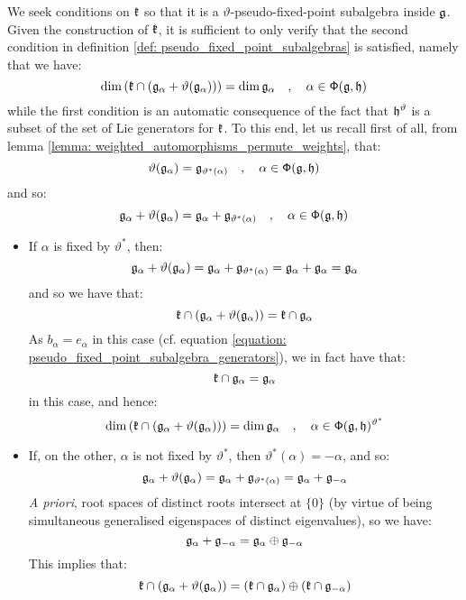         We seek conditions on $\mathfrak{k}$ so that it is a $\vartheta$-pseudo-fixed-point subalgebra inside $\mathfrak{g}$. Given the construction of $\mathfrak{k}$, it is sufficient to only verify that the second condition in definition \ref{def: pseudo_fixed_point_subalgebras} is satisfied, namely that we have:
            $$\dim\left( \mathfrak{k} \cap \left( \mathfrak{g}_{\alpha} + \vartheta(\mathfrak{g}_{\alpha}) \right) \right) = \dim \mathfrak{g}_{\alpha} \quad, \quad \alpha \in \mathsf{\Phi}(\mathfrak{g}, \mathfrak{h})$$
        while the first condition is an automatic consequence of the fact that $\mathfrak{h}^{\vartheta}$ is a subset of the set of Lie generators for $\mathfrak{k}$. To this end, let us recall first of all, from lemma \ref{lemma: weighted_automorphisms_permute_weights}, that:
            $$\vartheta(\mathfrak{g}_{\alpha}) = \mathfrak{g}_{\vartheta^*(\alpha)} \quad, \quad \alpha \in \mathsf{\Phi}(\mathfrak{g}, \mathfrak{h})$$
        and so:
            $$\mathfrak{g}_{\alpha} + \vartheta(\mathfrak{g}_{\alpha}) = \mathfrak{g}_{\alpha} + \mathfrak{g}_{\vartheta^*(\alpha)} \quad, \quad \alpha \in \mathsf{\Phi}(\mathfrak{g}, \mathfrak{h})$$
        \begin{itemize}
            \item If $\alpha$ is fixed by $\vartheta^*$, then:
                $$\mathfrak{g}_{\alpha} + \vartheta(\mathfrak{g}_{\alpha}) = \mathfrak{g}_{\alpha} + \mathfrak{g}_{\vartheta^*(\alpha)} = \mathfrak{g}_{\alpha} + \mathfrak{g}_{\alpha} = \mathfrak{g}_{\alpha}$$
            and so we have that:
                $$\mathfrak{k} \cap \left( \mathfrak{g}_{\alpha} + \vartheta(\mathfrak{g}_{\alpha}) \right) = \mathfrak{k} \cap \mathfrak{g}_{\alpha}$$
            As $b_{\alpha} = e_{\alpha}$ in this case (cf. equation \eqref{equation: pseudo_fixed_point_subalgebra_generators}), we in fact have that:
                $$\mathfrak{k} \cap \mathfrak{g}_{\alpha} = \mathfrak{g}_{\alpha}$$
            in this case, and hence:
                $$\dim\left( \mathfrak{k} \cap \left( \mathfrak{g}_{\alpha} + \vartheta(\mathfrak{g}_{\alpha}) \right) \right) = \dim \mathfrak{g}_{\alpha} \quad, \quad \alpha \in \mathsf{\Phi}(\mathfrak{g}, \mathfrak{h})^{\vartheta^*}$$
            \item If, on the other, $\alpha$ is not fixed by $\vartheta^*$, then $\vartheta^*(\alpha) = -\alpha$, and so:
                $$\mathfrak{g}_{\alpha} + \vartheta(\mathfrak{g}_{\alpha}) = \mathfrak{g}_{\alpha} + \mathfrak{g}_{\vartheta^*(\alpha)} = \mathfrak{g}_{\alpha} + \mathfrak{g}_{-\alpha}$$
            \textit{A priori}, root spaces of distinct roots intersect at $\{0\}$ (by virtue of being simultaneous generalised eigenspaces of distinct eigenvalues), so we have:
                $$\mathfrak{g}_{\alpha} + \mathfrak{g}_{-\alpha} = \mathfrak{g}_{\alpha} \oplus \mathfrak{g}_{-\alpha}$$
            This implies that:
                $$\mathfrak{k} \cap \left( \mathfrak{g}_{\alpha} + \vartheta(\mathfrak{g}_{\alpha}) \right) = (\mathfrak{k} \cap \mathfrak{g}_{\alpha}) \oplus (\mathfrak{k} \cap \mathfrak{g}_{-\alpha})$$
        \end{itemize}
        
